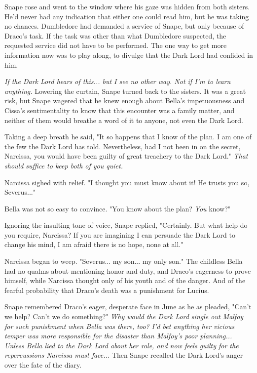 \documentclass[a4paper,11pt]{article}
\begin{document}
Snape rose and went to the window where his gaze was hidden from both sisters. He'd never had any indication that either one could read him, but he was taking no chances. Dumbledore had demanded a service of Snape, but only because of Draco's task. If the task was other than what Dumbledore suspected, the requested service did not have to be performed. The one way to get more information now was to play along, to divulge that the Dark Lord had confided in him.

\emph{If the Dark Lord hears of this... but I see no other way. Not if I'm to learn anything.} Lowering the curtain, Snape turned back to the sisters. It was a great risk, but Snape wagered that he knew enough about Bella's impetuousness and Cissa's sentimentality to know that this encounter was a family matter, and neither of them would breathe a word of it to anyone, not even the Dark Lord.

Taking a deep breath he said, "It so happens that I know of the plan. I am one of the few the Dark Lord has told. Nevertheless, had I not been in on the secret, Narcissa, you would have been guilty of great treachery to the Dark Lord." \emph{That should suffice to keep both of you quiet.}

Narcissa sighed with relief. "I thought you must know about it! He trusts you so, Severus..."

Bella was not so easy to convince. "You know about the plan? \emph{You} know?"

Ignoring the insulting tone of voice, Snape replied, "Certainly. But what help do you require, Narcissa? If you are imagining I can persuade the Dark Lord to change his mind, I am afraid there is no hope, none at all."

Narcissa began to weep. "Severus... my son... my only son." The childless Bella had no qualms about mentioning honor and duty, and Draco's eagerness to prove himself, while Narcissa thought only of his youth and of the danger. And of the fearful probability that Draco's death was a punishment for Lucius.

Snape remembered Draco's eager, desperate face in June as he as pleaded, "Can't we help? Can't we do something?" \emph{Why would the Dark Lord single out Malfoy for such punishment when Bella was there, too? I'd bet anything her vicious temper was more responsible for the disaster than Malfoy's poor planning... Unless Bella lied to the Dark Lord about her role, and now feels guilty for the repercussions Narcissa must face... }Then Snape recalled the Dark Lord's anger over the fate of the diary.
\end{document}
